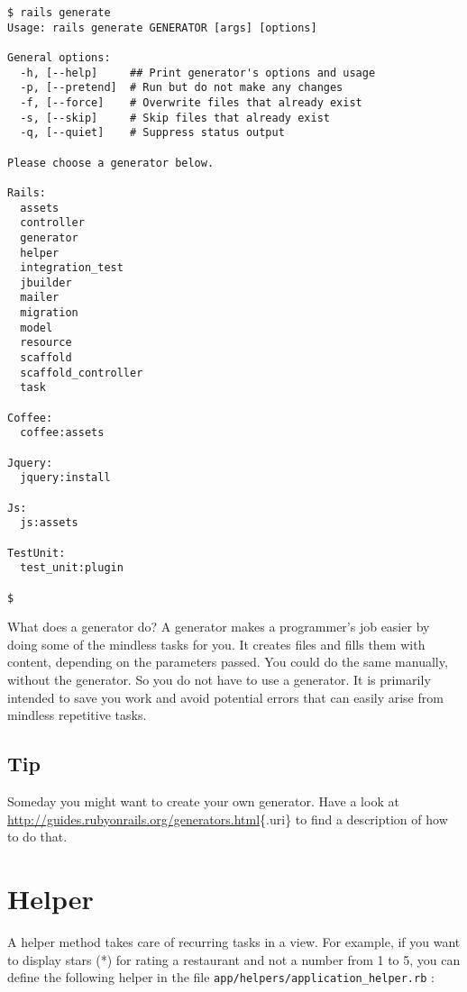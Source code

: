 \documentclass[a4paper]{book}
\begin{document}
\begin{shaded}\begin{verbatim}
$ rails generate
Usage: rails generate GENERATOR [args] [options]

General options:
  -h, [--help]     ## Print generator's options and usage
  -p, [--pretend]  # Run but do not make any changes
  -f, [--force]    # Overwrite files that already exist
  -s, [--skip]     # Skip files that already exist
  -q, [--quiet]    # Suppress status output

Please choose a generator below.

Rails:
  assets
  controller
  generator
  helper
  integration_test
  jbuilder
  mailer
  migration
  model
  resource
  scaffold
  scaffold_controller
  task

Coffee:
  coffee:assets

Jquery:
  jquery:install

Js:
  js:assets

TestUnit:
  test_unit:plugin

$
\end{verbatim}\end{shaded}

What does a generator do? A generator makes a programmer's job easier by doing some of the mindless tasks for you. It creates files and fills them with content, depending on the parameters passed. You could do the same manually, without the generator. So you do not have to use a generator. It is primarily intended to save you work and avoid potential errors that can easily arise from mindless repetitive tasks.

\subsection{Tip}\label{tip-5}

Someday you might want to create your own generator. Have a look at \url{http://guides.rubyonrails.org/generators.html}\{.uri\} to find a description of how to do that.

\section{Helper}\label{helper}

A helper method takes care of recurring tasks in a view. For example, if you want to display stars (*) for rating a restaurant and not a number from 1 to 5, you can define the following helper in the file \texttt{app/helpers/application\_helper.rb} :
\end{document}
